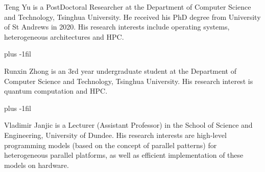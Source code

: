 \documentclass[10pt,journal,compsoc]{IEEEtran}
\begin{document}












\begin{IEEEbiography}{Teng Yu \textnormal{is a PostDoctoral Researcher at the Department of Computer Science and Technology, Tsinghua University. He received his PhD degree from University of St Andrews in 2020. His research interests include operating systems, heterogeneous architectures and HPC.}}
\end{IEEEbiography}
\baselineskip plus -1fil
\begin{IEEEbiography}{Runxin Zhong \textnormal{is an 3rd year undergraduate student at the Department of Computer Science and Technology, Tsinghua University. His research interest is quantum computation and HPC.}}
\end{IEEEbiography}
\baselineskip plus -1fil
\begin{IEEEbiography}{Vladimir Janjic \textnormal{is a Lecturer (Assistant Professor) in the School of Science and Engineering, University of Dundee. His research interests are high-level programming models (based on the concept of parallel patterns) for heterogeneous parallel platforms, as well as efficient implementation of these models on hardware.}}
\end{IEEEbiography}
\end{document}

